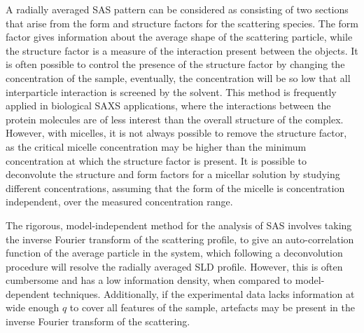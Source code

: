 A radially averaged SAS pattern can be considered as consisting of two sections that arise from the form and structure factors for the scattering species.
The form factor gives information about the average shape of the scattering particle, while the structure factor is a measure of the interaction present between the objects.
It is often possible to control the presence of the structure factor by changing the concentration of the sample, eventually, the concentration will be so low that all interparticle interaction is screened by the solvent.
This method is frequently applied in biological SAXS applications, where the interactions between the protein molecules are of less interest than the overall structure of the complex.
However, with micelles, it is not always possible to remove the structure factor, as the critical micelle concentration may be higher than the minimum concentration at which the structure factor is present.
It is possible to deconvolute the structure and form factors for a micellar solution by studying different concentrations, assuming that the form of the micelle is concentration independent, over the measured concentration range.

The rigorous, model-independent method for the analysis of SAS involves taking the inverse Fourier transform of the scattering profile, to give an auto-correlation function of the average particle in the system, which following a deconvolution procedure will resolve the radially averaged SLD profile.
However, this is often cumbersome and has a low information density, when compared to model-dependent techniques.
Additionally, if the experimental data lacks information at wide enough $q$ to cover all features of the sample, artefacts may be present in the inverse Fourier transform of the scattering.

